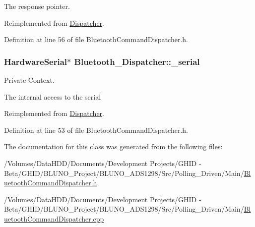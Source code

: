 \-The response pointer. 



\-Reimplemented from \hyperlink{class_dispatcher_a0e3c3d9054c4d8180aa56655bb6206a2}{\-Dispatcher}.



\-Definition at line 56 of file \-Bluetooth\-Command\-Dispatcher.\-h.

\hypertarget{class_bluetooth___dispatcher_a9b30fd1951f4e064a707ec75b941d18e}{
\subsubsection[{\-\_\-serial}]{\setlength{\rightskip}{0pt plus 5cm}\-Hardware\-Serial$\ast$ {\bf \-Bluetooth\-\_\-\-Dispatcher\-::\-\_\-serial}}}\label{class_bluetooth___dispatcher_a9b30fd1951f4e064a707ec75b941d18e}


\-Private \-Context. 

\-The internal access to the serial 

\-Reimplemented from \hyperlink{class_dispatcher_ab761cd7589c1d5fda8ff1b5ec4ce679f}{\-Dispatcher}.



\-Definition at line 53 of file \-Bluetooth\-Command\-Dispatcher.\-h.



\-The documentation for this class was generated from the following files\-:\begin{DoxyCompactItemize}
\item 
/\-Volumes/\-Data\-H\-D\-D/\-Documents/\-Development Projects/\-G\-H\-I\-D -\/ Beta/\-G\-H\-I\-D/\-B\-L\-U\-N\-O\-\_\-\-Project/\-B\-L\-U\-N\-O\-\_\-\-A\-D\-S1298/\-Src/\-Polling\-\_\-\-Driven/\-Main/\hyperlink{_bluetooth_command_dispatcher_8h}{\-Bluetooth\-Command\-Dispatcher.\-h}\item 
/\-Volumes/\-Data\-H\-D\-D/\-Documents/\-Development Projects/\-G\-H\-I\-D -\/ Beta/\-G\-H\-I\-D/\-B\-L\-U\-N\-O\-\_\-\-Project/\-B\-L\-U\-N\-O\-\_\-\-A\-D\-S1298/\-Src/\-Polling\-\_\-\-Driven/\-Main/\hyperlink{_bluetooth_command_dispatcher_8cpp}{\-Bluetooth\-Command\-Dispatcher.\-cpp}\end{DoxyCompactItemize}
